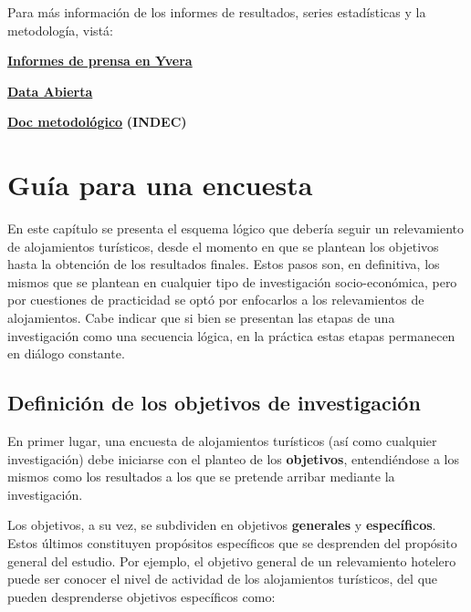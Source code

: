 \documentclass[
]{book}
\begin{document}
Para más información de los informes de resultados, series estadísticas y la metodología, vistá:

\href{https://www.yvera.tur.ar/estadistica/info/encuesta-de-ocupacion-hotelera-eoh}{\textbf{Informes de prensa en Yvera}}

\href{http://datos.yvera.tur.ar/dataset/encuesta-ocupacion-hotelera-parahotelera-eoh}{\textbf{Data Abierta}}

\href{https://www.indec.gob.ar/ftp/cuadros/economia/eoh_aspectos_metodologicos.pdf}{\textbf{Doc metodológico}} \textbf{(INDEC)}

\hypertarget{guiaencuesta}{%
\chapter{\texorpdfstring{\textbf{Guía para una encuesta}}{Guía para una encuesta}}\label{guiaencuesta}}

En este capítulo se presenta el esquema lógico que debería seguir un relevamiento de alojamientos turísticos, desde el momento en que se plantean los objetivos hasta la obtención de los resultados finales. Estos pasos son, en definitiva, los mismos que se plantean en cualquier tipo de investigación socio-económica, pero por cuestiones de practicidad se optó por enfocarlos a los relevamientos de alojamientos. Cabe indicar que si bien se presentan las etapas de una investigación como una secuencia lógica, en la práctica estas etapas permanecen en diálogo constante.

\hypertarget{definiciuxf3n-de-los-objetivos-de-investigaciuxf3n}{%
\section{Definición de los objetivos de investigación}\label{definiciuxf3n-de-los-objetivos-de-investigaciuxf3n}}

En primer lugar, una encuesta de alojamientos turísticos (así como cualquier investigación) debe iniciarse con el planteo de los \textbf{objetivos}, entendiéndose a los mismos como los resultados a los que se pretende arribar mediante la investigación.

Los objetivos, a su vez, se subdividen en objetivos \textbf{generales} y \textbf{específicos}. Estos últimos constituyen propósitos específicos que se desprenden del propósito general del estudio. Por ejemplo, el objetivo general de un relevamiento hotelero puede ser conocer el nivel de actividad de los alojamientos turísticos, del que pueden desprenderse objetivos específicos como:
\end{document}
